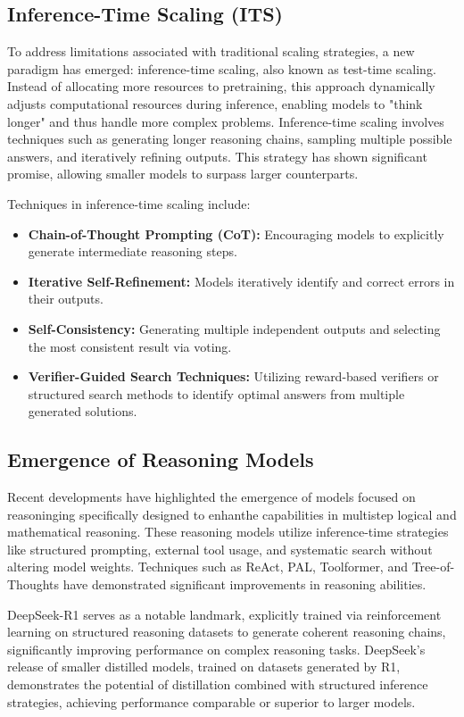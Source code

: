\subsection{Inference-Time Scaling (ITS)}
To address limitations associated with traditional scaling strategies, a new paradigm has emerged: inference-time scaling, also known as test-time scaling. Instead of allocating more resources to pretraining, this approach dynamically adjusts computational resources during inference, enabling models to "think longer" and thus handle more complex problems. Inference-time scaling involves techniques such as generating longer reasoning chains, sampling multiple possible answers, and iteratively refining outputs. This strategy has shown significant promise, allowing smaller models to surpass larger counterparts.

Techniques in inference-time scaling include:
\begin{itemize}
\item \textbf{Chain-of-Thought Prompting (CoT):} Encouraging models to explicitly generate intermediate reasoning steps.
\item \textbf{Iterative Self-Refinement:} Models iteratively identify and correct errors in their outputs.
\item \textbf{Self-Consistency:} Generating multiple independent outputs and selecting the most consistent result via voting.
\item \textbf{Verifier-Guided Search Techniques:} Utilizing reward-based verifiers or structured search methods to identify optimal answers from multiple generated solutions.
\end{itemize}

\subsection{Emergence of Reasoning Models}
Recent developments have highlighted the emergence of models focused on reasoninging specifically designed to enhanthe capabilities in multistep  logical and mathematical reasoning. These reasoning models utilize inference-time strategies like structured prompting, external tool usage, and systematic search without altering model weights. Techniques such as ReAct, PAL, Toolformer, and Tree-of-Thoughts have demonstrated significant improvements in reasoning abilities.

DeepSeek-R1 serves as a notable landmark, explicitly trained via reinforcement learning on structured reasoning datasets to generate coherent reasoning chains, significantly improving performance on complex reasoning tasks. DeepSeek's release of smaller distilled models, trained on datasets generated by R1, demonstrates the potential of distillation combined with structured inference strategies, achieving performance comparable or superior to larger models.

